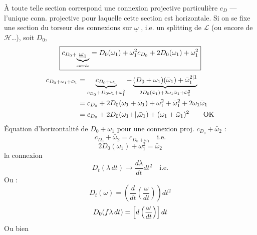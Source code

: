À toute telle section correspond une connexion projective particulière $c_D$ --- l'unique conn. projective pour laquelle cette section est horizontale.
Si on se fixe une section du  torseur des connexions sur $\underline\omega$ , i.e. un splitting de $\mathcal L$ (ou encore de $\mathcal H$\ldots), soit $D_0$, 
\[
\boxed{c_{D_0+\underbrace{\underline\omega_1}_{\text{entrée}}}={{D_0(\omega_1)+\omega_1^2}}c_{D_0}+2D_0(\omega_1)+\omega_1^2}
\]
\[
\begin{aligned}
c_{D_0+\omega_1+\bar\omega_1}
&=\underbrace{c_{D_0+\omega_1}}_{c_{D_0}+{D_0\omega_1}+\omega_1^2}
+\underbrace{(D_0+\omega_1)(\bar\omega_1)+\bar\omega_1^{{2|1}}}_{2D_0(\bar\omega_1)+2\omega_1\bar\omega_1+\bar\omega_1^2}\\
&=c_{D_0}+2D_0(\omega_1+\bar\omega_1)+\omega_1^2+\bar\omega_1^2+2\omega_1\bar\omega_1\\
&=c_{D_0}+2D_0(\omega_1{+|,}\bar\omega_1)+(\omega_1+\bar\omega_1)^2\qquad\text{OK}
\end{aligned}
\]
Équation d'horizontalité de $D_0+\omega_1$ pour une connexion proj. $c_{D_0}+\bar\omega_2$ :
\[
c_{D_0}+\bar\omega_2=c_{D_0+\omega_1}\quad\text{i.e.}
\]
\[
\boxed{2D_0(\omega_1)+\omega_1^2=\bar\omega_2}
\]
 la connexion
\[
D_t(\lambda\,dt)\longrightarrow\frac{d\lambda}{dt}dt^2\quad\text{i.e.}
\]
Ou :
\[
D_t(\omega)=\left(\frac d{dt}\left(\frac\omega{dt}\right)\right)dt^2
\]
\[
{D_0(f\lambda\,dt)}=\left[d\left(\frac\omega{dt}\right)\right]dt
\]
Ou bien

